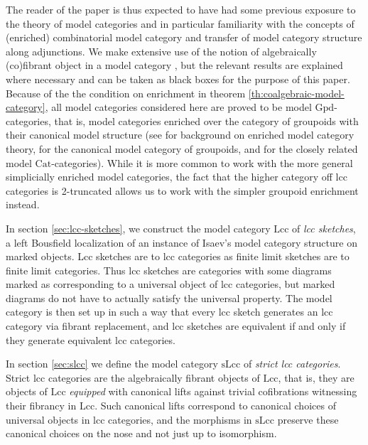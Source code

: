 \documentclass[a4paper]{article}
\theoremstyle{remark}
\theoremstyle{definition}
\begin{document}
The reader of the paper is thus expected to have had some previous exposure to the theory of model categories and in particular familiarity with the concepts of (enriched) combinatorial model category and transfer of model category structure along adjunctions.
We make extensive use of the notion of algebraically (co)fibrant object in a model category \cite{algebraic-models,coalgebraic-models}, but the relevant results are explained where necessary and can be taken as black boxes for the purpose of this paper.
Because of the the condition on enrichment in theorem \ref{th:coalgebraic-model-category}, all model categories considered here are proved to be model $\mathrm{Gpd}$-categories, that is, model categories enriched over the category of groupoids with their canonical model structure (see \cite{enriched-model-cats} for background on enriched model category theory, \cite{groupoid-model-cat} for the canonical model category of groupoids, and \cite{homotopy-theoretic-aspects} for the closely related model $\mathrm{Cat}$-categories).
While it is more common to work with the more general simplicially enriched model categories, the fact that the higher category off lcc categories is 2-truncated allows us to work with the simpler groupoid enrichment instead.

In section \ref{sec:lcc-sketches}, we construct the model category $\mathrm{Lcc}$ of \emph{lcc sketches}, a left Bousfield localization of an instance of Isaev's model category structure on marked objects.
Lcc sketches are to lcc categories as finite limit sketches are to finite limit categories.
Thus lcc sketches are categories with some diagrams marked as corresponding to a universal object of lcc categories, but marked diagrams do not have to actually satisfy the universal property.
The model category is then set up in such a way that every lcc sketch generates an lcc category via fibrant replacement, and lcc sketches are equivalent if and only if they generate equivalent lcc categories.

In section \ref{sec:slcc} we define the model category $\mathrm{sLcc}$ of \emph{strict lcc categories}.
Strict lcc categories are the algebraically fibrant objects of $\mathrm{Lcc}$, that is, they are objects of $\mathrm{Lcc}$ \emph{equipped} with canonical lifts against trivial cofibrations witnessing their fibrancy in $\mathrm{Lcc}$.
Such canonical lifts correspond to canonical choices of universal objects in lcc categories, and the morphisms in $\mathrm{sLcc}$ preserve these canonical choices on the nose and not just up to isomorphism.
\end{document}
